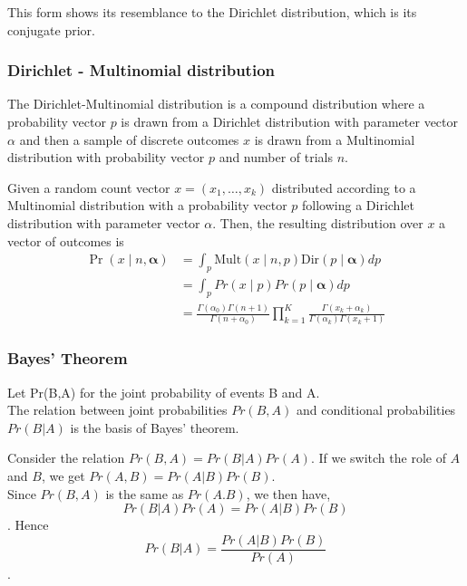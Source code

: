 					This form shows its resemblance to the Dirichlet distribution, which is its conjugate prior.
				\subsubsection{Dirichlet - Multinomial distribution}
					The Dirichlet-Multinomial distribution is a compound distribution where a probability vector $p$ is drawn from a Dirichlet distribution with parameter vector $\alpha$ and then a sample of discrete outcomes $x$ is drawn from a Multinomial distribution with probability vector $p$ and number of trials $n$.\cite{Minka2012EstimatingAD}
					\begin{defn}
						Given a random count vector $x=(x_1, \ldots, x_k)$ distributed according to a Multinomial distribution with a probability vector $p$ following a Dirichlet distribution with parameter vector $\alpha$. Then, the resulting distribution over $x$ a vector of outcomes is \cite{Minka2012EstimatingAD}
						\begin{equation}
						 \begin{aligned}
						 	\Pr({x} \mid n,{\boldsymbol {\alpha }}) &=
								 	\int _{p }
									 	\mathrm {Mult} (x \mid n,p )
									 	\mathrm {Dir} (p \mid {\boldsymbol {\alpha }})dp\\
									 								&=
									 \int _{p }
									 	Pr(x \mid p)Pr(p \mid \boldsymbol{\alpha}) dp\\
									 								&=
									 {\frac {\Gamma \left(\alpha _{0}\right)\Gamma \left(n+1\right)}{\Gamma \left(n+\alpha _{0}\right)}}\prod _{k=1}^{K}{\frac {\Gamma (x_{k}+\alpha _{k})}{\Gamma (\alpha _{k})\Gamma \left(x_{k}+1\right)}}
						 \end{aligned}
						\end{equation}
					\end{defn}

				\subsubsection{Bayes' Theorem}
				Let Pr(B,A) for the joint probability of events B and A.\\
				The relation between joint probabilities $Pr(B,A)$ and conditional probabilities $Pr(B|A)$ is the basis of Bayes’ theorem.\\
				\begin{defn}\label{dfn:bayestheorem}
					Consider the relation $ Pr(B,A) = Pr(B|A)Pr(A)$. If we switch the role of $A$ and $B$, we get $Pr(A,B) = Pr(A|B)Pr(B)$.\\
					Since $Pr(B,A)$ is the same as $Pr(A.B)$, we then have,
					\[
						Pr(B|A)Pr(A) = Pr(A|B)Pr(B)
					\].
					Hence
					\begin{equation}\label{eqn:baye_1}
						Pr(B|A) = \frac{Pr(A|B)Pr(B)}{Pr(A)}
					\end{equation}.\\
				\end{defn}


